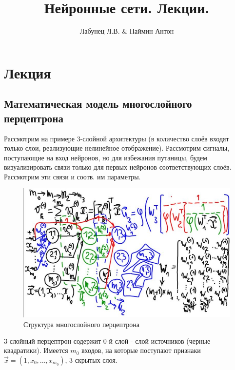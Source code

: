 \documentclass{article}
\begin{document}
\author{Лабунец Л.В. \& Паймин Антон}
\title{Нейронные сети. Лекции.}

\makeatletter
\begin{center}
    {\fontsize{14pt}{24pt}\selectfont\bfseries\@title\par}
    {\fontsize{14pt}{16pt}\@author\par}
\end{center}
\makeatother

\tableofcontents
\newpage

\section{Лекция}

\subsection{Математическая модель многослойного перцептрона}

Рассмотрим на примере 3-слойной архитектуры (в количество слоёв входят только слои, реализующие нелинейное отображение).
Рассмотрим сигналы, поступающие на вход нейронов, но для избежания путаницы, будем визуализировать связи только для первых нейронов соответствующих слоёв.
Рассмотрим эти связи и соотв. им параметры.

\begin{figure}[htbp]
    \centering
    \includegraphics[width=\textwidth]{hyperflat_3_1.jpeg}
    \caption{Структура многослойного перцептрона}
    \label{hyperflat_3_1}
\end{figure}

3-слойный перцептрон содержит 0-й слой - слой источников (черные квадратики). 
Имеется $m_{0}$ входов, на которые поступают признаки $\vec{x} = (1, x_0, ..., x_{m_{0}})$, 3 скрытых слоя.
\end{document}
